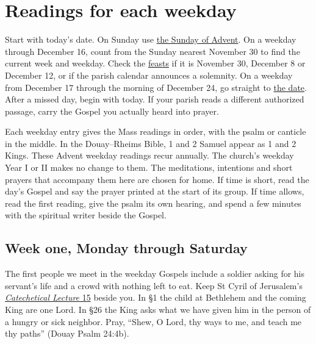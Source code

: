 \section{Readings for each weekday}
\label{sec:pc-advent-weekdays}

Start with today's date. On Sunday use \hyperref[sec:pc-advent-sundays]{the
Sunday of Advent}. On a weekday through December 16, count from the
Sunday nearest November 30 to find the current week and weekday. Check the
\hyperref[sec:pc-advent-feasts]{feasts} if it is November 30, December 8
or December 12, or if the parish calendar announces a solemnity. On a
weekday from December 17 through the morning of December 24, go straight
to \hyperref[sec:pc-advent-last-days]{the date}. After a missed day,
begin with today. If your parish reads a different authorized passage,
carry the Gospel you actually heard into prayer.

Each weekday entry gives the Mass readings in order, with the psalm or
canticle in the middle. In the Douay--Rheims Bible, 1 and 2 Samuel
appear as 1 and 2 Kings. These Advent weekday readings recur annually.
The church's weekday Year I or II makes no change to them. The
meditations, intentions and short prayers that accompany them here are
chosen for home. If time is short, read the day's Gospel and say the
prayer printed at the start of its group. If time allows, read the first
reading, give the psalm its own hearing, and spend a few minutes with
the spiritual writer beside the Gospel.

\subsection{Week one, Monday through Saturday}

The first people we meet in the weekday Gospels include a soldier asking
for his servant's life and a crowd with nothing left to eat. Keep St
Cyril of Jerusalem's \href{https://www.newadvent.org/fathers/310115.htm}{\emph{Catechetical Lecture} 15}
beside you. In §1 the child at Bethlehem and the coming King are one
Lord. In §26 the King asks what we have given him in the person of a
hungry or sick neighbor. Pray, “Shew, O Lord, thy ways to me, and teach
me thy paths” (Douay Psalm 24:4b).

